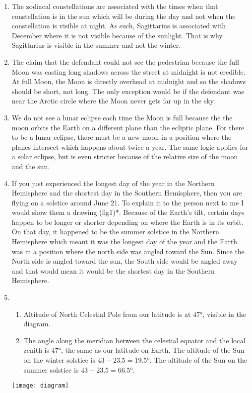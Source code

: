 \documentclass[../hw1.tex]{subfiles}
\begin{document}
    \begin{enumerate}
        \item The zodiacal constellations are associated with the times when that constellation is in the sun which will be during the day and not when the constellation is visible at night. As such, Sagittarius is associated with December where it is not visible because of the sunlight. That is why Sagittarius is visible in the summer and not the winter.
        \item The claim that the defendant could not see the pedestrian because the full Moon was casting long shadows across the street at midnight is not credible. At full Moon, the Moon is directly overhead at midnight and so the shadows should be short, not long. The only exception would be if the defendant was near the Arctic circle where the Moon never gets far up in the sky.
        \item We do not see a lunar eclipse each time the Moon is full because the the moon orbits the Earth on a different plane than the ecliptic plane. For there to be a lunar eclipse, there must be a new moon in a position where the planes intersect which happens about twice a year. The same logic applies for a solar eclipse, but is even stricter because of the relative size of the moon and the sun.
        \item If you just experienced the longest day of the year in the Northern Hemisphere and the shortest day in the Southern Hemisphere, then you are flying on a solstice around June 21. To explain it to the person next to me I would show them a drawing (fig1)*. Because of the Earth’s tilt, certain days happen to be longer or shorter depending on where the Earth is in its orbit. On that day, it happened to be the summer solstice in the Northern Hemisphere which meant it was the longest day of the year and the Earth was in a position where the north side was angled toward the Sun. Since the North side is angled toward the sun, the South side would be angled away and that would mean it would be the shortest day in the Southern Hemisphere.
        \item \begin{enumerate}
            \item Altitude of North Celestial Pole from our latitude is at \ang{47}, visible in the diagram.
            \item The angle along the meridian between the celestial equator and the local zenith is \ang{47}, the same as our latitude on Earth. The altitude of the Sun on the winter solstice is $43 - 23.5 = \ang{19.5}$. The altitude of the Sun on the summer solstice is $43 + 23.5 = \ang{66.5}$.
        \end{enumerate}
        \begin{center}
            \texttt{[image: diagram]}
        \end{center}
    \end{enumerate}
\end{document}
